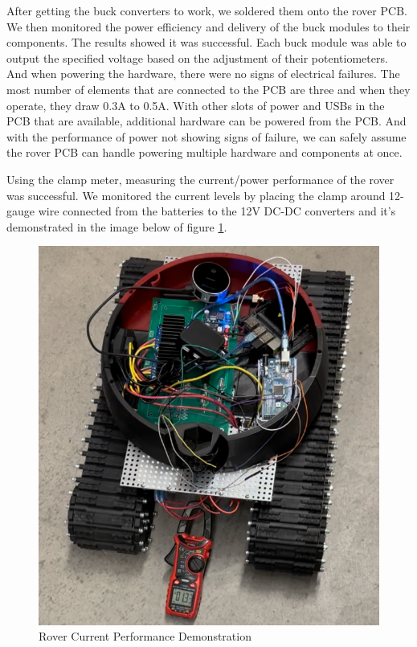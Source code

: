 \documentclass[a4paper, 10pt]{article}
\begin{document}
	After getting the buck converters to work, we soldered them onto the rover PCB. We then monitored the power efficiency and delivery of the buck modules to their components. The results showed it was successful. Each buck module was able to output the specified voltage based on the adjustment of their potentiometers. And when powering the hardware, there were no signs of electrical failures. The most number of elements that are connected to the PCB are three and when they operate, they draw 0.3A to 0.5A. With other slots of power and USBs in the PCB that are available, additional hardware can be powered from the PCB. And with the performance of power not showing signs of failure, we can safely assume the rover PCB can handle powering multiple hardware and components at once.

	Using the clamp meter, measuring the current/power performance of the rover was successful. We monitored the current levels by placing the clamp around 12-gauge wire connected from the batteries to the 12V DC-DC converters and it's demonstrated in the image below of figure \ref{Rover Current Performance}.

\begin{figure} [!h]
			\centering
			\includegraphics[scale=0.6]{Photos/Clamp Meter Demo}
			\caption{Rover Current Performance Demonstration}
			\label{Rover Current Performance}
		\end{figure}
\end{document}
